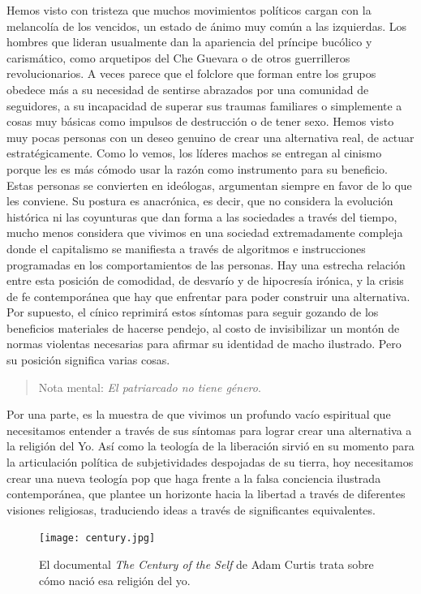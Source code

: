 Hemos visto con tristeza que muchos movimientos políticos cargan con la melancolía de los vencidos, un estado de ánimo muy común a las izquierdas. Los hombres que lideran usualmente dan la apariencia del príncipe bucólico y carismático, como arquetipos del Che Guevara o de otros guerrilleros revolucionarios. A veces parece que el folclore que forman entre los grupos obedece más a su necesidad de sentirse abrazados por una comunidad de seguidores, a su incapacidad de superar sus traumas familiares o simplemente a cosas muy básicas como impulsos de destrucción o de tener sexo. Hemos visto muy pocas personas con un deseo genuino de crear una alternativa real, de actuar estratégicamente. Como lo vemos, los líderes machos se entregan al cinismo porque les es más cómodo usar la razón como instrumento para su beneficio. Estas personas se convierten en ideólogas, argumentan siempre en favor de lo que les conviene. Su postura es anacrónica, es decir, que no considera la evolución histórica ni las coyunturas que dan forma a las sociedades a través del tiempo, mucho menos considera que vivimos en una sociedad extremadamente compleja donde el capitalismo se manifiesta a través de algoritmos e instrucciones programadas en los comportamientos de las personas. Hay una estrecha relación entre esta posición de comodidad, de desvarío y de hipocresía irónica, y la crisis de fe contemporánea que hay que enfrentar para poder construir una alternativa. Por supuesto, el cínico reprimirá estos síntomas para seguir gozando de los beneficios materiales de hacerse pendejo, al costo de invisibilizar un montón de normas violentas necesarias para afirmar su identidad de macho ilustrado. Pero su posición significa varias cosas.

\begin{quote}
	Nota mental: \emph{El patriarcado no tiene género}.
\end{quote}

Por una parte, es la muestra de que vivimos un profundo vacío espiritual que necesitamos entender a través de sus síntomas para lograr crear una alternativa a la religión del Yo. Así como la teología de la liberación sirvió en su momento para la articulación política de subjetividades despojadas de su tierra, hoy necesitamos crear una nueva teología pop que haga frente a la falsa conciencia ilustrada contemporánea, que plantee un horizonte hacia la libertad a través de diferentes visiones religiosas, traduciendo ideas a través de significantes equivalentes.

\begin{figure}[htbp]
	\centering
	\texttt{[image: century.jpg]}
	\caption[\emph{The Century of the Self}]{El documental \emph{The Century of the Self} de Adam Curtis trata sobre cómo nació esa religión del yo.}
	\label{fig:century}
\end{figure}

